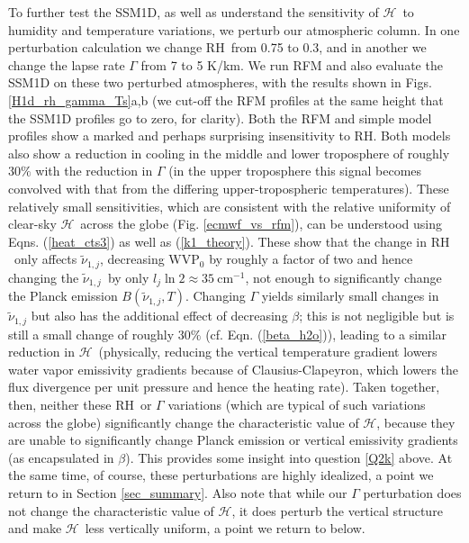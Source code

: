 \documentclass{ametsoc}
\newcommand{\eqnref}[1]{(\ref{#1})}
\newcommand{\cminverse}{\ensuremath{\mathrm{cm^{-1}}}}
\newcommand{\RH}{\ensuremath{\mathrm{RH}}}
\newcommand{\wv}{\ensuremath{\widetilde{\nu}}}
\newcommand{\ch}{\ensuremath{\mathcal{H}}}
\newcommand{\lj}{\ensuremath{l_j}}
\newcommand{\WVP}{\ensuremath{\mathrm{WVP}}}
\newcommand{\konej}{\ensuremath{\wv_{1,j}}}
\begin{document}
 To further test the SSM1D,  as well as understand the sensitivity of \ch\ to humidity and temperature variations, we perturb our atmospheric column. In one perturbation calculation we change \RH\ from 0.75 to 0.3, and in another we change the lapse rate $\Gamma$ from  7 to 5 K/km.  We  run RFM and also evaluate the SSM1D on these two perturbed atmospheres, with the results shown in Figs. \ref{H1d_rh_gamma_Ts}a,b  (we cut-off the RFM profiles at the same height that the SSM1D profiles go to zero, for clarity). Both the RFM and simple model profiles show a marked and perhaps surprising insensitivity to \RH. Both models also show a reduction in cooling in the middle and lower troposphere of roughly $30\%$ with the reduction in $\Gamma$ (in the upper troposphere this signal becomes convolved with that from the differing upper-tropospheric temperatures). These relatively small sensitivities, which are consistent with  the relative uniformity of clear-sky \ch\  across the globe (Fig. \ref{ecmwf_vs_rfm}), can be understood using Eqns. \eqnref{heat_cts3} as well as \eqnref{k1_theory}. These show that the change in \RH\ only affects \konej, decreasing $\WVP_0$ by roughly a factor of two and hence changing the \konej\ by only $\lj\ln 2\approx 35\ \cminverse$, not enough to significantly change the Planck emission $B(\konej,T)$. Changing $\Gamma$  yields similarly small changes in  $\konej$ but also has the additional effect of decreasing $\beta$; this is not negligible but is still a small change of roughly $30\%$  (cf. Eqn. \eqnref{beta_h2o}), leading to a similar reduction in \ch\ (physically, reducing the vertical temperature gradient  lowers  water vapor emissivity gradients because of Clausius-Clapeyron, which lowers the flux divergence per unit pressure and hence the heating rate). Taken together, then, neither these \RH\ or $\Gamma$ variations (which are typical of such variations across the globe) significantly change the characteristic value of \ch, because they are unable to significantly change Planck emission or vertical emissivity gradients (as encapsulated in $\beta$). This provides some insight into question \ref{Q2k} above. At the same time, of course, these perturbations are highly idealized, a point we return to in Section \ref{sec_summary}. Also note that while our $\Gamma$ perturbation does not change the characteristic value of \ch, it does perturb the vertical structure and make \ch\ less vertically uniform, a point we return to below.
\end{document}
